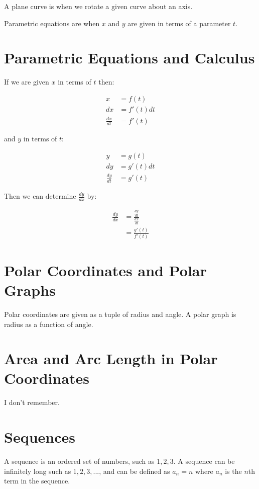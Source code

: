 \documentclass{article}
\begin{document}
A plane curve is when we rotate a given curve about an axis.

Parametric equations are when $x$ and $y$ are given in terms of a parameter $t$.

\section{Parametric Equations and Calculus}

If we are given $x$ in terms of $t$ then:

\begin{align*}
  x &= f(t) \\
  dx &= f'(t)dt \\
  \frac{dx}{dt} &= f'(t)
\end{align*}

and $y$ in terms of $t$:

\begin{align*}
  y &= g(t) \\
  dy &= g'(t)dt \\
  \frac{dy}{dt} &= g'(t)
\end{align*}

Then we can determine $\frac{dy}{dx}$ by:

\begin{align*}
  \frac{dy}{dx} &= \frac{ \frac{dy}{dt} }{ \frac{dx}{dt} } \\
  &= \frac{g'(t)}{f'(t)}
\end{align*}

\section{Polar Coordinates and Polar Graphs}

Polar coordinates are given as a tuple of radius and angle.  A polar
graph is radius as a function of angle.

\section{Area and Arc Length in Polar Coordinates}

I don't remember.

\section{Sequences}

A sequence is an ordered set of numbers, such as $1,2,3$.  A sequence
can be infinitely long such as $1,2,3,...$, and can be defined as $a_n
= n$ where $a_n$ is the $n$th term in the sequence.
\end{document}

